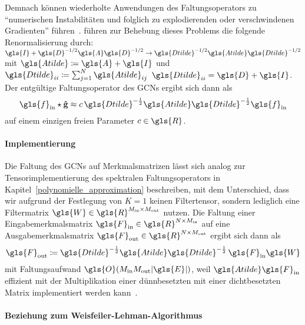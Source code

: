 Demnach können wiederholte Anwendungen des Faltungsoperators zu \enquote{numerischen Instabilitäten und folglich zu explodierenden oder verschwindenen Gradienten} führen~\cite{gcn}.
\citeauthor{gcn} führen zur Behebung dieses Problems die folgende Renormalisierung durch: $\gls{I} + \gls{D}^{-1/2} \gls{A} \gls{D}^{-1/2} \rightarrow \gls{Dtilde}^{-1/2} \gls{Atilde} \gls{Dtilde}^{-1/2}$ mit $\gls{Atilde} \coloneqq \gls{A} + \gls{I}$ und $\gls{Dtilde}_{ii} \coloneqq \sum_{j=1}^N \gls{Atilde}_{ij}$ \bzw{} $\gls{Dtilde}_{ii} = \gls{D} + \gls{I}$.
Der entgültige Faltungsoperator des \glspl{GCN} ergibt sich dann als
\begin{equation}
  \gls{f}_{\mathrm{in}} \star \ve{\hat g} \approx c\, \gls{Dtilde}^{-\frac{1}{2}} \gls{Atilde} \gls{Dtilde}^{-\frac{1}{2}} \gls{f}_{\mathrm{in}}
  \label{eq:gcn_renorm}
\end{equation}
auf einem einzigen freien Parameter $c \in \gls{R}$.

\paragraph{Implementierung}
\label{gcn_tensor}

Die Faltung des \glspl{GCN} auf Merkmalsmatrizen lässt sich analog zur Tensorimplementierung des spektralen Faltungsoperators in Kapitel~\ref{polynomielle_approximation} beschreiben, mit dem Unterschied, dass wir aufgrund der Festlegung von $K=1$ keinen Filtertensor, sondern lediglich eine Filtermatrix $\gls{W} \in \gls{R}^{M_{\mathrm{in}} \times M_{\mathrm{out}}}$ nutzen.
Die Faltung einer Eingabemerkmalsmatrix $\gls{F}_{\mathrm{in}} \in \gls{R}^{N \times M_{\mathrm{in}}}$ auf eine Ausgabemerkmalsmatrix $\gls{F}_{\mathrm{out}} \in \gls{R}^{N \times M_{\mathrm{out}}}$ ergibt sich dann als
\begin{equation}
  \gls{F}_{\mathrm{out}} \coloneqq \gls{Dtilde}^{-\frac{1}{2}} \gls{Atilde} \gls{Dtilde}^{-\frac{1}{2}}\, \gls{F}_{\mathrm{in}} \gls{W}
  \label{eq:gcn_tensor}
\end{equation}
mit Faltungsaufwand $\gls{O}\left(M_{\mathrm{in}}M_{\mathrm{out}}\left|\gls{E}\right|\right)$, weil $\gls{Atilde}\gls{F}_{\mathrm{in}}$ effizient mit der Multiplikation einer dünnbesetzten mit einer dichtbesetzten Matrix implementiert werden kann~\cite{gcn}.

\paragraph{Beziehung zum Weisfeiler-Lehman-Algorithmus}
\label{weisfeiler_lehman_beziehung}

